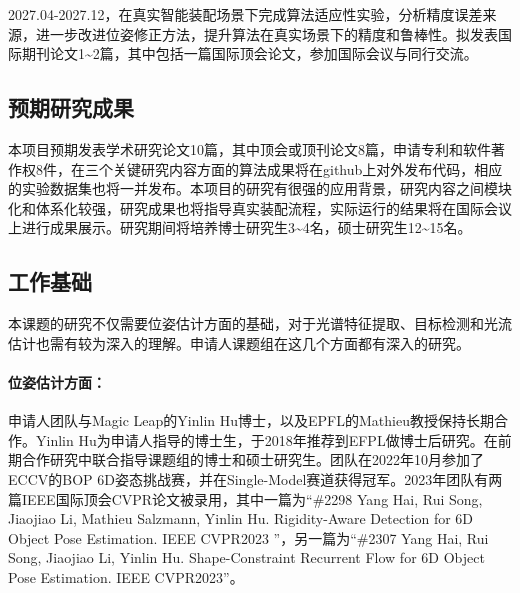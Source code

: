 \documentclass[12pt]{article}
\newcommand{\myPara}[1]{\paragraph{#1：}}
\begin{document}
2027.04-2027.12，在真实智能装配场景下完成算法适应性实验，分析精度误差来源，进一步改进位姿修正方法，提升算法在真实场景下的精度和鲁棒性。拟发表国际期刊论文1\textasciitilde2篇，其中包括一篇国际顶会论文，参加国际会议与同行交流。

\subsection{预期研究成果}

本项目预期发表学术研究论文10篇，其中顶会或顶刊论文8篇，申请专利和软件著作权8件，在三个关键研究内容方面的算法成果将在github上对外发布代码，相应的实验数据集也将一并发布。本项目的研究有很强的应用背景，研究内容之间模块化和体系化较强，研究成果也将指导真实装配流程，实际运行的结果将在国际会议上进行成果展示。研究期间将培养博士研究生3\textasciitilde4名，硕士研究生12\textasciitilde15名。



\subsection{工作基础}


本课题的研究不仅需要位姿估计方面的基础，对于光谱特征提取、目标检测和光流估计也需有较为深入的理解。申请人课题组在这几个方面都有深入的研究。
\myPara{位姿估计方面}
申请人团队与Magic Leap的Yinlin Hu博士，以及EPFL的Mathieu教授保持长期合作。Yinlin Hu为申请人指导的博士生，于2018年推荐到EFPL做博士后研究。在前期合作研究中联合指导课题组的博士和硕士研究生。团队在2022年10月参加了ECCV的BOP 6D姿态挑战赛，并在Single-Model赛道获得冠军。2023年团队有两篇IEEE国际顶会CVPR论文被录用，其中一篇为“\#2298 Yang Hai, Rui Song, Jiaojiao Li, Mathieu Salzmann, Yinlin Hu. Rigidity-Aware Detection for 6D Object Pose Estimation. IEEE CVPR2023 ”，另一篇为“\#2307 Yang Hai, Rui Song, Jiaojiao Li, Yinlin Hu. Shape-Constraint Recurrent Flow for 6D Object Pose Estimation. IEEE CVPR2023”。

\iffalse
\end{document}
